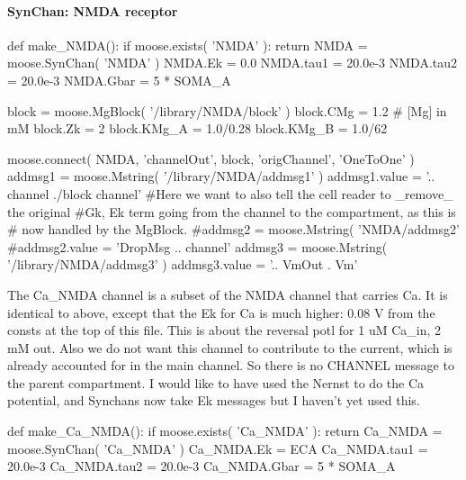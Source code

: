 \documentclass[]{article}%
\begin{document}
\paragraph{SynChan: NMDA receptor}

\nwenddocs{}\endmoddef\nwstartdeflinemarkup{}\nwenddeflinemarkup
def make_NMDA():
  if moose.exists( 'NMDA' ):
    return
  NMDA = moose.SynChan( 'NMDA' )
  NMDA.Ek = 0.0
  NMDA.tau1 = 20.0e-3
  NMDA.tau2 = 20.0e-3
  NMDA.Gbar = 5 * SOMA_A

  block = moose.MgBlock( '/library/NMDA/block' )
  block.CMg = 1.2    #  [Mg] in mM
  block.Zk = 2
  block.KMg_A = 1.0/0.28
  block.KMg_B = 1.0/62

  moose.connect( NMDA, 'channelOut', block, 'origChannel', 'OneToOne' )
  addmsg1 = moose.Mstring( '/library/NMDA/addmsg1' )
  addmsg1.value = '.. channel  ./block  channel'
  #Here we want to also tell the cell reader to _remove_ the original
  #Gk, Ek term going from the channel to the compartment, as this is
  # now handled by the MgBlock.
  #addmsg2 = moose.Mstring( 'NMDA/addmsg2'
  #addmsg2.value = 'DropMsg  ..  channel'
  addmsg3 = moose.Mstring( '/library/NMDA/addmsg3' )
  addmsg3.value = '.. VmOut  .  Vm'

\eatline
{}\nwendcode{}\nwdocspar
 The {\Tt{}Ca{\_}NMDA\nwendquote} channel is a subset of the NMDA channel that carries Ca.  It is
 identical to above, except that the Ek for Ca is much higher: 0.08 V from the
 consts at the top of this file.  This is about the reversal potl for 1 uM
 {\Tt{}Ca{\_}in\nwendquote}, 2 mM out.  Also we do not want this channel to contribute to the
 current, which is already accounted for in the main channel. So there is no
 CHANNEL message to the parent compartment.  I would like to have used the
 Nernst to do the Ca potential, and Synchans now take Ek messages but I haven't
 yet used this.

\nwenddocs{}\plusendmoddef\nwstartdeflinemarkup{}\nwenddeflinemarkup
def make_Ca_NMDA():
  if moose.exists( 'Ca_NMDA' ):
    return
  Ca_NMDA = moose.SynChan( 'Ca_NMDA' )
  Ca_NMDA.Ek = ECA
  Ca_NMDA.tau1 = 20.0e-3
  Ca_NMDA.tau2 = 20.0e-3
  Ca_NMDA.Gbar = 5 * SOMA_A
\end{document}
